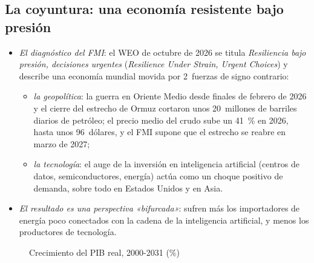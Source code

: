 \documentclass[11pt]{article}
\begin{document}
\subsection{La coyuntura: una economía resistente bajo presión}\label{sec:coyuntura}

\begin{itemize}
\item \emph{El diagnóstico del FMI}: el WEO de octubre de 2026 se titula \emph{Resiliencia bajo presión, decisiones urgentes} (\emph{Resilience Under Strain, Urgent Choices}) y describe una economía mundial movida por 2~fuerzas de signo contrario\nocite{FMI2026WEO}:
  \begin{itemize}
  \item \emph{la geopolítica}: la guerra en Oriente Medio desde finales de febrero de 2026 y el cierre del estrecho de Ormuz cortaron unos 20~millones de barriles diarios de petróleo; el precio medio del crudo sube un 41~\% en 2026, hasta unos 96~dólares, y el FMI supone que el estrecho se reabre en marzo de 2027\nocite{FMI2026WEO};
  \item \emph{la tecnología}: el auge de la inversión en inteligencia artificial (centros de datos, semiconductores, energía) actúa como un choque positivo de demanda, sobre todo en Estados Unidos y en Asia.
  \end{itemize}
\item \emph{El resultado es una perspectiva «bifurcada»}: sufren más los importadores de energía poco conectados con la cadena de la inteligencia artificial, y menos los productores de tecnología.
\end{itemize}

\begin{figure}[H]
\centering
\caption{Crecimiento del PIB real, 2000-2031 (\%)}\label{fig:crecimiento-mundial}
\end{figure}
\end{document}
